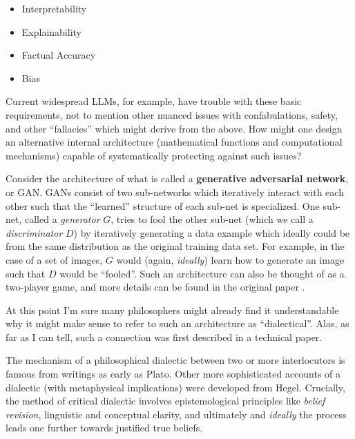 \documentclass[11pt, oneside]{article}   	%
\begin{document}
\begin{itemize}
    \item Interpretability
    \item Explainability
    \item Factual Accuracy
    \item Bias
\end{itemize}

Current widespread LLMs, for example, have trouble with these basic requirements, not to mention other nuanced issues with confabulations, safety, and other ``fallacies'' which might derive from the above.  How might one design an alternative internal architecture (mathematical functions and computational mechanisms) capable of systematically protecting against such issues?  


Consider the architecture of what is called a \textbf{generative adversarial network}, or GAN.  GANs consist of two sub-networks which iteratively interact with each other such that the ``learned'' structure of each sub-net is specialized.  One sub-net, called a \emph{generator} $G$, tries to fool the other sub-net (which we call a \emph{discriminator} $D$) by iteratively generating a data example which ideally could be from the same distribution as the original training data set.  For example, in the case of a set of images, $G$ would (again, \emph{ideally}) learn how to generate an image such that $D$ would be ``fooled''.  Such an architecture can also be thought of as a two-player game, and more details can be found in the original paper .  \citep{}


At this point I'm sure many philosophers might already find it understandable why it might make sense to refer to such an architecture as ``dialectical''.  Alas, as far as I can tell, such a connection was first described in a technical paper.

The mechanism of a philosophical dialectic between two or more interlocutors is famous from writings as early as Plato.  Other more sophisticated accounts of a dialectic (with metaphysical implications) were developed from Hegel.  \citep{sep-hegel-dialectics}  Crucially, the method of critical dialectic involves epistemological principles like \emph{belief revision}, linguistic and conceptual clarity, and ultimately and \emph{ideally} the process leads one further towards justified true beliefs. 
\end{document}

